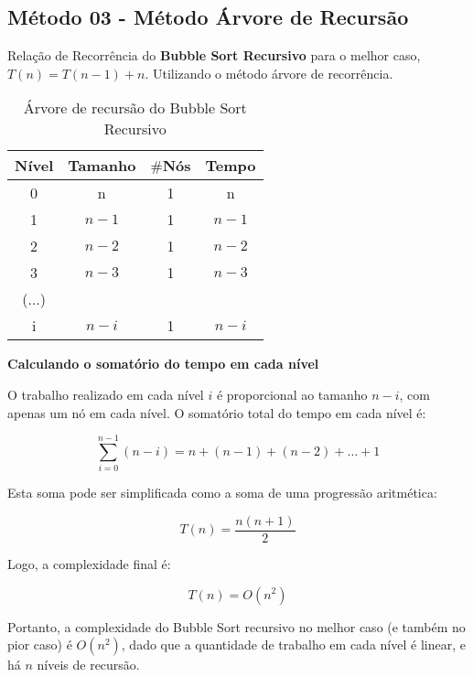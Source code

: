 \subsection{Método 03 - Método Árvore de Recursão}

Relação de Recorrência do \textbf{Bubble Sort Recursivo} para o melhor caso, \( T(n) = T(n - 1) + n \). Utilizando o método árvore de recorrência.

\begin{table}[ht!]
    \centering
    \begin{tabular}{|c|c|c|c|}
    \hline
    \textbf{Nível} & \textbf{Tamanho} & $\#$\textbf{Nós} & \textbf{Tempo} \\ \hline
     0 & n & 1 & n \\ \hline
     1 & $n - 1$ & 1 & $n - 1$ \\ \hline
     2 & $n - 2$ & 1 & $n - 2$ \\ \hline
     3 & $n - 3$ & 1 & $n - 3$ \\ \hline
     (...) & & & \\ \hline
     i & $n - i$ & 1 & $n - i$ \\ \hline 
    \end{tabular}  
    \caption{Árvore de recursão do Bubble Sort Recursivo}
\end{table}

\textbf{Calculando o somatório do tempo em cada nível}

O trabalho realizado em cada nível \(i\) é proporcional ao tamanho \( n - i \), com apenas um nó em cada nível. O somatório total do tempo em cada nível é:

\[
\sum_{i=0}^{n-1} (n - i) = n + (n-1) + (n-2) + \dots + 1
\]

Esta soma pode ser simplificada como a soma de uma progressão aritmética:

\[
T(n) = \frac{n(n+1)}{2}
\]

Logo, a complexidade final é:

\[
T(n) = O(n^2)
\]

Portanto, a complexidade do Bubble Sort recursivo no melhor caso (e também no pior caso) é \( O(n^2) \), dado que a quantidade de trabalho em cada nível é linear, e há \( n \) níveis de recursão.
